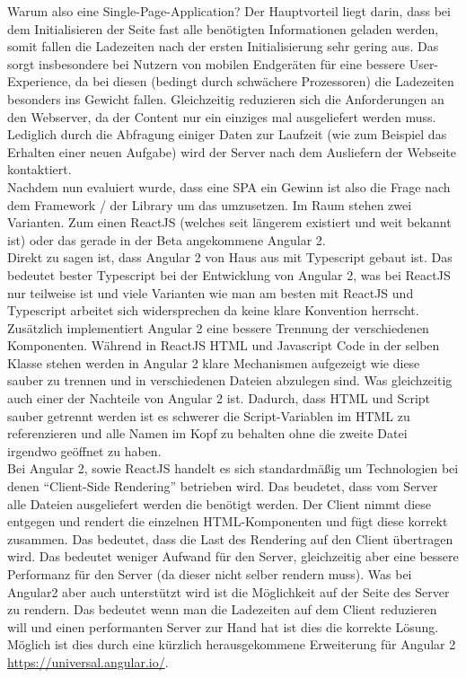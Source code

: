Warum also eine Single-Page-Application? Der Hauptvorteil liegt darin, dass bei dem Initialisieren der Seite fast alle benötigten Informationen geladen werden, somit fallen die Ladezeiten nach der ersten Initialisierung sehr gering aus. Das sorgt insbesondere bei Nutzern von mobilen Endgeräten für eine bessere User-Experience, da bei diesen (bedingt durch schwächere Prozessoren) die Ladezeiten besonders ins Gewicht fallen. Gleichzeitig reduzieren sich die Anforderungen an den Webserver, da der Content nur ein einziges mal ausgeliefert werden muss. Lediglich durch die Abfragung einiger Daten zur Laufzeit (wie zum Beispiel das Erhalten einer neuen Aufgabe) wird der Server nach dem Ausliefern der Webseite kontaktiert.\\

Nachdem nun evaluiert wurde, dass eine SPA ein Gewinn ist also die Frage nach dem Framework / der Library um das umzusetzen. Im Raum stehen zwei Varianten. Zum einen ReactJS (welches seit längerem existiert und weit bekannt ist) oder das gerade in der Beta angekommene Angular 2. \\
Direkt zu sagen ist, dass Angular 2 von Haus aus mit Typescript gebaut ist. Das bedeutet bester Typescript bei der Entwicklung von Angular 2, was bei ReactJS nur teilweise ist und viele Varianten wie man am besten mit ReactJS und Typescript arbeitet sich widersprechen da keine klare Konvention herrscht. \\
Zusätzlich implementiert Angular 2 eine bessere Trennung der verschiedenen Komponenten. Während in ReactJS HTML und Javascript Code in der selben Klasse stehen werden in Angular 2 klare Mechanismen aufgezeigt wie diese sauber zu trennen und in verschiedenen Dateien abzulegen sind. Was gleichzeitig auch einer der Nachteile von Angular 2 ist. Dadurch, dass HTML und Script sauber getrennt werden ist es schwerer die Script-Variablen im HTML zu referenzieren und alle Namen im Kopf zu behalten ohne die zweite Datei irgendwo geöffnet zu haben. \\
Bei Angular 2, sowie ReactJS handelt es sich standardmäßig um Technologien bei denen ``Client-Side Rendering'' betrieben wird. Das beudetet, dass vom Server alle Dateien ausgeliefert werden die benötigt werden. Der Client nimmt diese entgegen und rendert die einzelnen HTML-Komponenten und fügt diese korrekt zusammen. Das bedeutet, dass die Last des Rendering auf den Client übertragen wird. Das bedeutet weniger Aufwand für den Server, gleichzeitig aber eine bessere Performanz für den Server (da dieser nicht selber rendern muss). Was bei Angular2 aber auch unterstützt wird ist die Möglichkeit auf der Seite des Server zu rendern. Das bedeutet wenn man  die Ladezeiten auf dem Client reduzieren will und einen performanten Server zur Hand hat ist dies die korrekte Lösung. Möglich ist dies durch eine kürzlich herausgekommene Erweiterung für Angular 2 \url{https://universal.angular.io/}. \\

